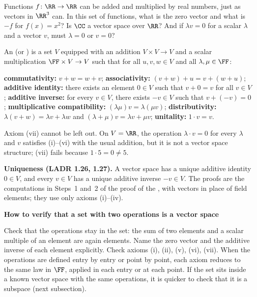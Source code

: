 \documentclass[10pt]{scrartcl}
\newenvironment{methodbox}[1]{\begin{mdframed}[style=methodstyle]\textbf{\color{NavyBlue}#1}\par\vspace{2pt}}{\end{mdframed}}
\begin{document}
\begin{qbox}
  Functions $f\colon\RR\to\RR$ can be added and multiplied by real numbers, just as vectors in $\RR^3$ can. In this set of functions, what is the zero vector and what is $-f$ for $f(x)=x^2$? Is $\CC$ a vector space over $\RR$? And if $\lambda v=0$ for a scalar $\lambda$ and a vector $v$, must $\lambda=0$ or $v=0$?
\end{qbox}

\begin{definition*}
  An  (or ) is a set $V$ equipped with an addition $V\times V\to V$ and a scalar multiplication $\FF\times V\to V$ such that for all $u,v,w\in V$ and all $\lambda,\mu\in\FF$:
  \begin{enumerate}[(i)]
    \ii \textbf{commutativity:} $v+w=w+v$;
    \ii \textbf{associativity:} $(v+w)+u=v+(w+u)$;
    \ii \textbf{additive identity:} there exists an element $0\in V$ such that $v+0=v$ for all $v\in V$;
    \ii \textbf{additive inverse:} for every $v\in V$, there exists $-v\in V$ such that $v+(-v)=0$;
    \ii \textbf{multiplicative compatibility:} $(\lambda\mu)v=\lambda(\mu v)$;
    \ii \textbf{distributivity:} $\lambda(v+w)=\lambda v+\lambda w$ and $(\lambda+\mu)v=\lambda v+\mu v$;
    \ii \textbf{unitality:} $1\cdot v=v$.
  \end{enumerate}
\end{definition*}

Axiom (vii) cannot be left out. On $V=\RR$, the operation $\lambda\cdot v=0$ for every $\lambda$ and $v$ satisfies (i)--(vi) with the usual addition, but it is not a vector space structure; (vii) fails because $1\cdot 5=0\ne5$.

\textbf{Uniqueness (LADR 1.26, 1.27).} A vector space has a unique additive identity $0\in V$, and every $v\in V$ has a unique additive inverse $-v\in V$. The proofs are the computations in Steps~1 and~2 of the proof of the , with vectors in place of field elements; they use only axioms (i)--(iv).

\begin{methodbox}{How to verify that a set with two operations is a vector space}
  \begin{steps}
    \ii Check that the operations stay in the set: the sum of two elements and a scalar multiple of an element are again elements.
    \ii Name the zero vector and the additive inverse of each element explicitly.
    \ii Check axioms (i), (ii), (v), (vi), (vii). When the operations are defined entry by entry or point by point, each axiom reduces to the same law in $\FF$, applied in each entry or at each point.
    \ii If the set sits inside a known vector space with the same operations, it is quicker to check that it is a subspace (next subsection).
  \end{steps}
\end{methodbox}
\end{document}
